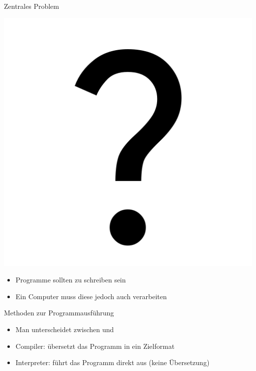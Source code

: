 \begin{frame}{Zentrales Problem}
	\begin{minipage}{.35\textwidth}
	\end{minipage}%
	\hfill
	\hfill
	\begin{minipage}{.34\textwidth}
		\centerline{\includegraphics[width=.5\textwidth]{assets/google_icon_question_mark.png}}
	\end{minipage}

	\begin{itemize}
		\item Programme sollten  zu schreiben sein
		\item[\Rightarrow] Ein Computer muss diese jedoch auch  verarbeiten
	\end{itemize}
\end{frame}

\begin{frame}{Methoden zur Programmausführung}
	\begin{itemize}
		\item Man unterscheidet zwischen  und 
		\item Compiler: übersetzt das Programm in ein Zielformat
		\item Interpreter: führt das Programm direkt aus (keine Übersetzung)
	\end{itemize}
\end{frame}

